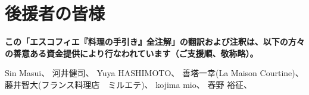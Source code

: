 \hypertarget{benefactors}{%
\section{後援者の皆様}\label{benefactors}}

\thispagestyle{empty}

\small

\textbf{この「エスコフィエ『料理の手引き』全注解」の翻訳および注釈は、以下の方々の善意ある資金提供により行なわれています（ご支援順、敬称略）。}

\normalsize
\vspace{1\zw}

Sin Masui、\href{20180524-23h,2x,novelsoundsmail@gmail.com}{}
河井健司、\href{20180525-0h14,10x,kwibeng@gmail.com}{} Yuya
HASHIMOTO、\href{20180525-1h40,2x,hashimo0910@gmail.com}{} 善塔一幸(La
Maison
Courtine)、\href{20180525-8h56,10x,kazuyukizento120@docomo.ne.jp}{}
藤井智大(フランス料理店　ミルエテ)、\href{20180525-10h07,1x,apple19761019@yahoo.co.jp}{}
kojima mio、\href{20180525-12h23,1x,teeeeshow@yahoo.co.jp}{} 春野
裕征、\href{20180528-2h41,1x,amanojack.v-o-v@i.softbank.jp}{}
